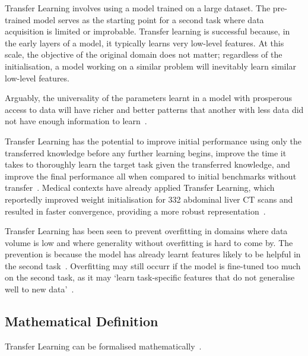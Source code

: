 \documentclass[11pt,twoside]{report}
\begin{document}
Transfer Learning involves using a model trained on a large dataset. The pre-trained model serves as the starting point for a second task where data acquisition is limited or improbable. Transfer learning is successful because, in the early layers of a model, it typically learns very low-level features. At this scale, the objective of the original domain does not matter; regardless of the initialisation, a model working on a similar problem will inevitably learn similar low-level features. 

Arguably, the universality of the parameters learnt in a model with prosperous access to data will have richer and better patterns that another with less data did not have enough information to learn~\cite{deep-learning-book, survey-on-transfer-learning}.

Transfer Learning has the potential to improve initial performance using only the transferred knowledge before any further learning begins, improve the time it takes to thoroughly learn the target task given the transferred knowledge, and improve the final performance all when compared to initial benchmarks without transfer~\cite{torrey-handbook}. Medical contexts have already applied Transfer Learning, which reportedly improved weight initialisation for 332 abdominal liver CT scans and resulted in faster convergence, providing a more robust representation~\cite{liver-lesion-via-transfer-learning}.

Transfer Learning has been seen to prevent overfitting in domains where data volume is low and where generality without overfitting is hard to come by. The prevention is because the model has already learnt features likely to be helpful in the second task~\cite{geeks-transfer-learning}. Overfitting may still occurr if the model is fine-tuned too much on the second task, as it may `learn task-specific features that do not generalise well to new data'~\cite{geeks-transfer-learning}.

\subsection{Mathematical Definition}

Transfer Learning can be formalised mathematically~\cite{survey-on-transfer-learning, concise-review-of-transfer-learning}.
\end{document}
